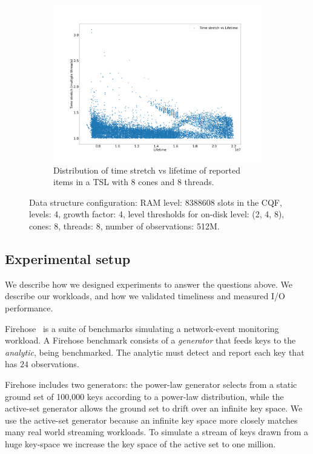 \begin{figure}
{\begin{subfigure}{.50\textwidth}
  \includegraphics[width=\linewidth]{../LERT-src/sigmod20_figs/timestretch-lifetime.png}
  \captionsetup{margin=.5cm}
  \caption{Distribution of time stretch vs lifetime of reported items in a
    TSL with 8 cones and 8 threads.}
  \label{fig:timestretch-analysis}
\end{subfigure}
}
\caption{Data structure configuration: RAM level: 8388608 slots in
    the CQF, levels: 4, growth factor: 4, level thresholds for on-disk
    level: (2, 4, 8), cones: 8, threads: 8, number of
  observations: 512M.
}
\label{fig:stretch-analysis}
\end{figure}


\subsection{Experimental setup}
\label{setup}

We describe how we designed experiments to answer the questions 
above. We describe our workloads, 
and how we validated timeliness and measured I/O performance.

 Firehose~\cite{AndersonPl13} is a suite of benchmarks
simulating a network-event monitoring workload. A Firehose benchmark
consists of a \textit{generator} that feeds keys to the \textit{analytic},
being benchmarked. The analytic must detect
and report each key that has $24$ observations.

Firehose includes two generators: the power-law generator selects from
a static ground set of 100,000 keys according to a power-law distribution, while
the active-set generator allows the ground set to drift over an infinite key
space. We use the active-set generator 
because an infinite key space more closely matches many real world streaming workloads. 
To simulate a stream of keys drawn from a huge key-space we increase the key space
of the active set to one million.


